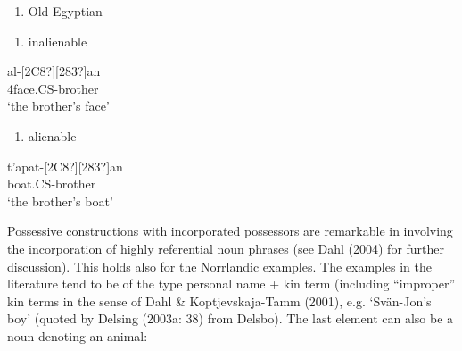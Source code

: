 \begin{enumerate} %
\item 
Old Egyptian

\end{enumerate} %
\setcounter{listLFOxcviiileveli}{0}
\begin{enumerate} %
\item 
inalienable

\end{enumerate} %
\ea\label{}
\gll [127?]al-[2C8?][283?]an\\


4face.CS-brother\\ %


‘the brother’s face’  
\z


\begin{enumerate} %
\item 
alienable

\end{enumerate} %
\ea\label{}
\gll t’apat-[2C8?][283?]an\\


boat.CS-brother\\ %


‘the brother’s boat’
\z


Possessive constructions with incorporated possessors are remarkable in involving the incorporation of highly referential noun phrases (see Dahl (2004) for further discussion). This holds also for the Norrlandic examples. The examples in the literature tend to be of the type personal name + kin term (including “improper” kin terms in the sense of Dahl \& Koptjevskaja-Tamm (2001), e.g.  ‘Svän-Jon’s boy’ (quoted by Delsing (2003a: 38) from Delsbo). The last element can also be a noun denoting an animal:

